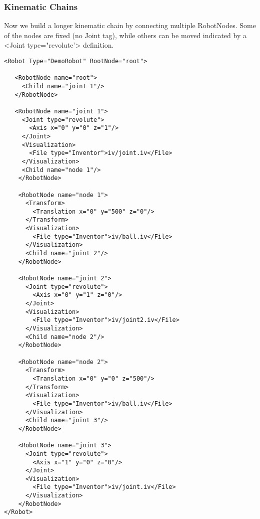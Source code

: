 \subsubsection*{Kinematic Chains}
\par
Now we build a longer kinematic chain by connecting multiple RobotNodes. Some of the nodes are fixed (no Joint tag), while others can be moved indicated by a <Joint type="revolute'> definition. 
\par
\begin{lstlisting}
<Robot Type="DemoRobot" RootNode="root">

   <RobotNode name="root">
     <Child name="joint 1"/>
   </RobotNode>

   <RobotNode name="joint 1">
     <Joint type="revolute">
       <Axis x="0" y="0" z="1"/>
     </Joint>
     <Visualization>
       <File type="Inventor">iv/joint.iv</File>
     </Visualization>
     <Child name="node 1"/>
    </RobotNode>

    <RobotNode name="node 1">
      <Transform>
        <Translation x="0" y="500" z="0"/>
      </Transform>
      <Visualization>
        <File type="Inventor">iv/ball.iv</File>
      </Visualization>
      <Child name="joint 2"/>
    </RobotNode>

    <RobotNode name="joint 2">
      <Joint type="revolute">
        <Axis x="0" y="1" z="0"/>
      </Joint>
      <Visualization>
        <File type="Inventor">iv/joint2.iv</File>
      </Visualization>
      <Child name="node 2"/>
    </RobotNode>

    <RobotNode name="node 2">
      <Transform>
        <Translation x="0" y="0" z="500"/>
      </Transform>
      <Visualization>
        <File type="Inventor">iv/ball.iv</File>
      </Visualization>
      <Child name="joint 3"/>
    </RobotNode>

    <RobotNode name="joint 3">
      <Joint type="revolute">
        <Axis x="1" y="0" z="0"/>
      </Joint>
      <Visualization>
        <File type="Inventor">iv/joint.iv</File>
      </Visualization>
    </RobotNode> 
</Robot>
\end{lstlisting}
\par
